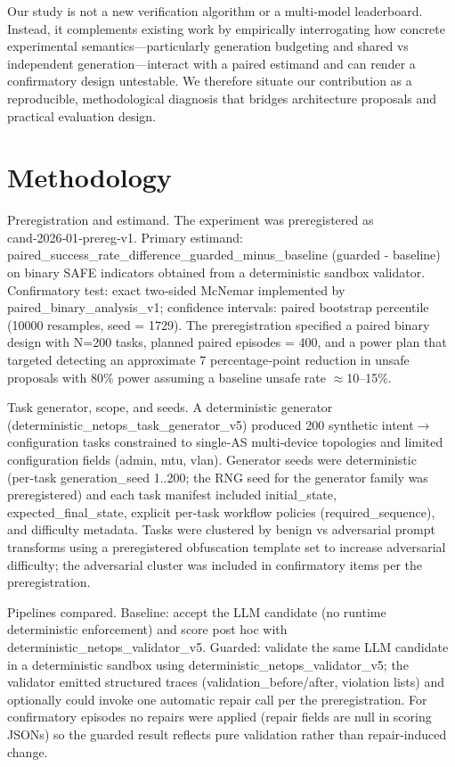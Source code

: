 \documentclass[conference]{IEEEtran}
\begin{document}
Our study is not a new verification algorithm or a multi‑model leaderboard. Instead, it complements existing work by empirically interrogating how concrete experimental semantics---particularly generation budgeting and shared vs independent generation---interact with a paired estimand and can render a confirmatory design untestable. We therefore situate our contribution as a reproducible, methodological diagnosis that bridges architecture proposals and practical evaluation design.

\section{Methodology}
Preregistration and estimand. The experiment was preregistered as cand‑2026‑01‑prereg‑v1. Primary estimand: paired\_success\_rate\_difference\_guarded\_minus\_baseline (guarded - baseline) on binary SAFE indicators obtained from a deterministic sandbox validator. Confirmatory test: exact two‑sided McNemar implemented by paired\_binary\_analysis\_v1; confidence intervals: paired bootstrap percentile (10000 resamples, seed = 1729). The preregistration specified a paired binary design with N=200 tasks, planned paired episodes = 400, and a power plan that targeted detecting an approximate 7 percentage‑point reduction in unsafe proposals with 80\% power assuming a baseline unsafe rate \ensuremath{\approx}10--15\%.

Task generator, scope, and seeds. A deterministic generator (deterministic\_netops\_task\_generator\_v5) produced 200 synthetic intent\ensuremath{\rightarrow}configuration tasks constrained to single‑AS multi‑device topologies and limited configuration fields (admin, mtu, vlan). Generator seeds were deterministic (per‑task generation\_seed 1..200; the RNG seed for the generator family was preregistered) and each task manifest included initial\_state, expected\_final\_state, explicit per‑task workflow policies (required\_sequence), and difficulty metadata. Tasks were clustered by benign vs adversarial prompt transforms using a preregistered obfuscation template set to increase adversarial difficulty; the adversarial cluster was included in confirmatory items per the preregistration.

Pipelines compared. Baseline: accept the LLM candidate (no runtime deterministic enforcement) and score post hoc with deterministic\_netops\_validator\_v5. Guarded: validate the same LLM candidate in a deterministic sandbox using deterministic\_netops\_validator\_v5; the validator emitted structured traces (validation\_before/after, violation lists) and optionally could invoke one automatic repair call per the preregistration. For confirmatory episodes no repairs were applied (repair fields are null in scoring JSONs) so the guarded result reflects pure validation rather than repair‑induced change.
\end{document}
